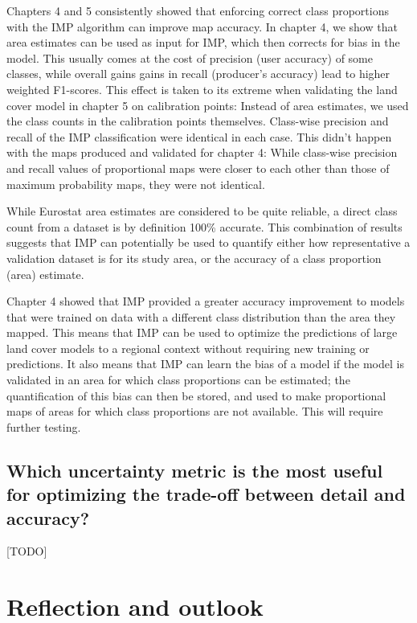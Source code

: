         Chapters 4 and 5 consistently showed that enforcing correct class proportions with the IMP algorithm can improve map accuracy. In chapter 4, we show that area estimates can be used as input for IMP, which then corrects for bias in the model. This usually comes at the cost of precision (user accuracy) of some classes, while overall gains gains in recall (producer's accuracy) lead to higher weighted F1-scores. This effect is taken to its extreme when validating the land cover model in chapter 5 on calibration points: Instead of area estimates, we used the class counts in the calibration points themselves. Class-wise precision and recall of the IMP classification were identical in each case. This didn't happen with the maps produced and validated for chapter 4: While class-wise precision and recall values of proportional maps were closer to each other than those of maximum probability maps, they were not identical.
    
        While Eurostat area estimates are considered to be quite reliable, a direct class count from a dataset is by definition 100\% accurate. This combination of results suggests that IMP can potentially be used to quantify either how representative a validation dataset is for its study area, or the accuracy of a class proportion (area) estimate. 

        Chapter 4 showed that IMP provided a greater accuracy improvement to models that were trained on data with a different class distribution than the area they mapped. This means that IMP can be used to optimize the predictions of large land cover models to a regional context without requiring new training or predictions. It also means that IMP can learn the bias of a model if the model is validated in an area for which class proportions can be estimated; the quantification of this bias can then be stored, and used to make proportional maps of areas for which class proportions are not available. This will require further testing. 

    \subsection{Which uncertainty metric is the most useful for optimizing the trade-off between detail and accuracy?}
    \label{syn:rq5}

    [TODO]

\section{Reflection and outlook}

